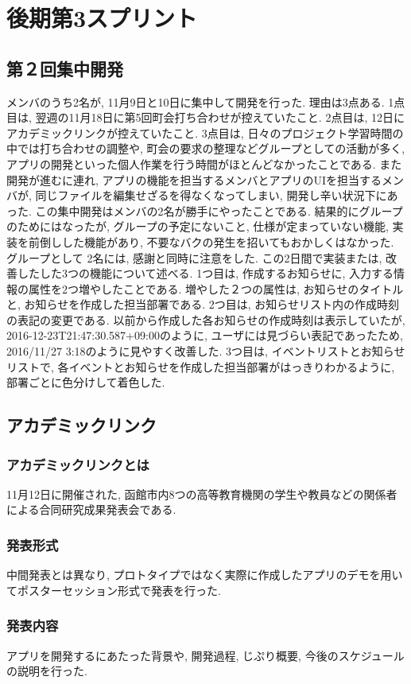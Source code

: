 \section{後期第3スプリント}
\subsection{第２回集中開発}
メンバのうち2名が, 11月9日と10日に集中して開発を行った. 理由は3点ある. 1点目は, 翌週の11月18日に第5回町会打ち合わせが控えていたこと.
2点目は, 12日にアカデミックリンクが控えていたこと. 3点目は, 日々のプロジェクト学習時間の中では打ち合わせの調整や, 町会の要求の整理などグループとしての活動が多く,
アプリの開発といった個人作業を行う時間がほとんどなかったことである. また開発が進むに連れ, アプリの機能を担当するメンバとアプリのUIを担当するメンバが, 同じファイルを編集せざるを得なくなってしまい,
開発し辛い状況下にあった. この集中開発はメンバの2名が勝手にやったことである. 結果的にグループのためにはなったが, グループの予定にないこと, 仕様が定まっていない機能, 実装を前倒しした機能があり,
不要なバクの発生を招いてもおかしくはなかった. グループとして 2名には, 感謝と同時に注意をした. この2日間で実装または, 改善したした3つの機能について述べる. 1つ目は, 作成するお知らせに,
入力する情報の属性を2つ増やしたことである. 増やした２つの属性は, お知らせのタイトルと, お知らせを作成した担当部署である. 2つ目は, お知らせリスト内の作成時刻の表記の変更である.
以前から作成した各お知らせの作成時刻は表示していたが, 2016-12-23T21:47:30.587+09:00のように, ユーザには見づらい表記であったため, 2016/11/27 3:18のように見やすく改善した.
3つ目は, イベントリストとお知らせリストで, 各イベントとお知らせを作成した担当部署がはっきりわかるように, 部署ごとに色分けして着色した.

\subsection{アカデミックリンク}
\subsubsection{アカデミックリンクとは}
11月12日に開催された, 函館市内8つの高等教育機関の学生や教員などの関係者による合同研究成果発表会である.
\subsubsection{発表形式}
中間発表とは異なり, プロトタイプではなく実際に作成したアプリのデモを用いてポスターセッション形式で発表を行った.
\subsubsection{発表内容}
アプリを開発するにあたった背景や, 開発過程, じぷり概要, 今後のスケジュールの説明を行った.


